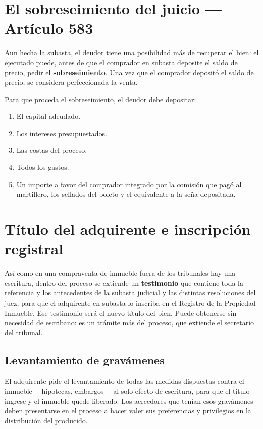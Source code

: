 \documentclass[12pt,oneside]{book}
\begin{document}
\section{El sobreseimiento del juicio --- Artículo 583}

Aun hecha la subasta, el deudor tiene una posibilidad más de recuperar el bien: el ejecutado puede, antes de que el comprador en subasta deposite el saldo de precio, pedir el \textbf{sobreseimiento}. Una vez que el comprador depositó el saldo de precio, se considera perfeccionada la venta.

Para que proceda el sobreseimiento, el deudor debe depositar:

\begin{enumerate}
    \item El capital adeudado.
    \item Los intereses presupuestados.
    \item Las costas del proceso.
    \item Todos los gastos.
    \item Un importe a favor del comprador integrado por la comisión que pagó al martillero, los sellados del boleto y el equivalente a la seña depositada.
\end{enumerate}

\section{Título del adquirente e inscripción registral}

Así como en una compraventa de inmueble fuera de los tribunales hay una escritura, dentro del proceso se extiende un \textbf{testimonio} que contiene toda la referencia y los antecedentes de la subasta judicial y las distintas resoluciones del juez, para que el adquirente en subasta lo inscriba en el Registro de la Propiedad Inmueble. Ese testimonio será el nuevo título del bien. Puede obtenerse sin necesidad de escribano: es un trámite más del proceso, que extiende el secretario del tribunal.

\subsection{Levantamiento de gravámenes}

El adquirente pide el levantamiento de todas las medidas dispuestas contra el inmueble ---hipotecas, embargos--- al solo efecto de escritura, para que el título ingrese y el inmueble quede liberado. Los acreedores que tenían esos gravámenes deben presentarse en el proceso a hacer valer sus preferencias y privilegios en la distribución del producido.
\end{document}

